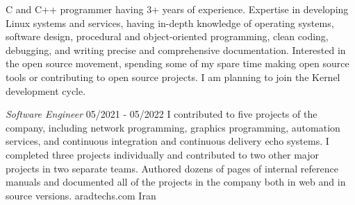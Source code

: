 \documentclass[a4paper,12pt]{memoir} %
\begin{document}
\userinformation %

\framebreak %


\CVDate




{C and C++ programmer having 3+ years of experience. Expertise in developing Linux systems and services, having in-depth knowledge of operating systems, software design, procedural and object-oriented programming, clean coding, debugging, and writing precise and comprehensive documentation. Interested in the open source movement, spending some of my spare time making open source tools or contributing to open source projects. I am planning to join the Kernel development cycle.}


\SmallSep %




{\textit{Software Engineer}}
{05/2021 - 05/2022}
{I contributed to five projects of the company, including network programming, graphics programming, automation services, and continuous integration and continuous delivery echo systems.
I completed three projects individually and contributed to two other major projects in two separate teams.
Authored dozens of pages of internal reference manuals and documented all of the projects in the company both in web and in source versions.
}
{aradtechs.com}
{Iran}

\end{document}
